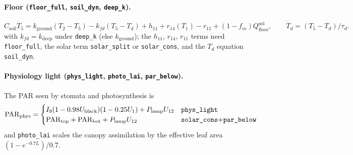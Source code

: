 \documentclass[11pt,a4paper]{article}
\begin{document}
\paragraph{Floor (\texttt{floor\_full}, \texttt{soil\_dyn}, \texttt{deep\_k}).}
\begin{equation}
C_{\text{soil}}\dot T_5=k_{\text{ground}}(T_2-T_5)-k_{fd}(T_5-T_d)+h_{11}+r_{14}(T_1)-r_{11}+(1-f_m)Q_{\text{floor}}^{\text{sol}},
\qquad \dot T_d=(T_5-T_d)/\tau_d .
\end{equation}
with $k_{fd}=k_{\text{deep}}$ under \texttt{deep\_k} (else $k_{\text{ground}}$); the $h_{11}$, $r_{14}$, $r_{11}$ terms need \texttt{floor\_full}, the solar term \texttt{solar\_split} or \texttt{solar\_cons}, and the $T_d$ equation \texttt{soil\_dyn}.

\paragraph{Physiology light (\texttt{phys\_light}, \texttt{photo\_lai}, \texttt{par\_below}).} The PAR seen by
stomata and photosynthesis is
\begin{equation}
\mathrm{PAR}_{\text{phys}}=
\begin{cases}
I_9(1-0.98U_{\text{black}})(1-0.25U_1)+P_{\text{lamp}}U_{12} & \text{\texttt{phys\_light}}\\
\mathrm{PAR}_{\text{top}}+\mathrm{PAR}_{\text{bot}}+P_{\text{lamp}}U_{12} & \text{\texttt{solar\_cons}+\texttt{par\_below}}
\end{cases}
\end{equation}
and \texttt{photo\_lai} scales the canopy assimilation by the effective leaf area $(1-e^{-0.7L})/0.7$.
\end{document}
